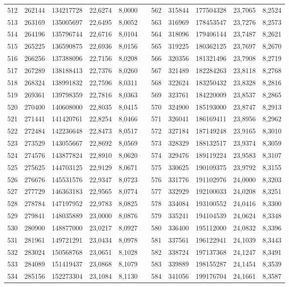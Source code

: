 \begin{longtable}{rrrrrrrrrrr}
512&262144&134217728&22,6274&8,0000&&562&315844&177504328&23,7065&8,2524\\
513&263169&135005697&22,6495&8,0052&&563&316969&178453547&23,7276&8,2573\\
514&264196&135796744&22,6716&8,0104&&564&318096&179406144&23,7487&8,2621\\
515&265225&136590875&22,6936&8,0156&&565&319225&180362125&23,7697&8,2670\\
516&266256&137388096&22,7156&8,0208&&566&320356&181321496&23,7908&8,2719\\
517&267289&138188413&22,7376&8,0260&&567&321489&182284263&23,8118&8,2768\\
518&268324&138991832&22,7596&8,0311&&568&322624&183250432&23,8328&8,2816\\
519&269361&139798359&22,7816&8,0363&&569&323761&184220009&23,8537&8,2865\\
520&270400&140608000&22,8035&8,0415&&570&324900&185193000&23,8747&8,2913\\
521&271441&141420761&22,8254&8,0466&&571&326041&186169411&23,8956&8,2962\\
522&272484&142236648&22,8473&8,0517&&572&327184&187149248&23,9165&8,3010\\
523&273529&143055667&22,8692&8,0569&&573&328329&188132517&23,9374&8,3059\\
524&274576&143877824&22,8910&8,0620&&574&329476&189119224&23,9583&8,3107\\
525&275625&144703125&22,9129&8,0671&&575&330625&190109375&23,9792&8,3155\\
526&276676&145531576&22,9347&8,0723&&576&331776&191102976&24,0000&8,3203\\
527&277729&146363183&22,9565&8,0774&&577&332929&192100033&24,0208&8,3251\\
528&278784&147197952&22,9783&8,0825&&578&334084&193100552&24,0416&8,3300\\
529&279841&148035889&23,0000&8,0876&&579&335241&194104539&24,0624&8,3348\\
530&280900&148877000&23,0217&8,0927&&580&336400&195112000&24,0832&8,3396\\
531&281961&149721291&23,0434&8,0978&&581&337561&196122941&24,1039&8,3443\\
532&283024&150568768&23,0651&8,1028&&582&338724&197137368&24,1247&8,3491\\
533&284089&151419437&23,0868&8,1079&&583&339889&198155287&24,1454&8,3539\\
534&285156&152273304&23,1084&8,1130&&584&341056&199176704&24,1661&8,3587\\

\end{longtable}
